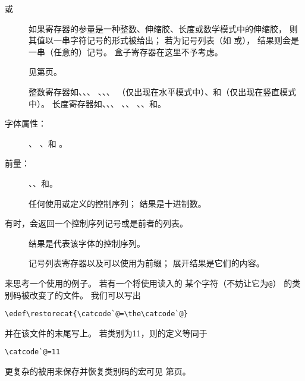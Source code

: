 \documentclass{book}
\begin{document}
\begin{description}\item [或]
如果寄存器的参量是一种整数、伸缩胶、长度或数学模式中的伸缩胶，
则其值以一串字符记号的形式被给出；
若为记号列表（如
或），
结果则会是一串（任意的）记号。
盒子寄存器在这里不予考虑。
\item []
见第\pageref{codename}页。
\item []
整数寄存器如、、、
、、、
（仅出现在水平模式中）、和（仅出现在竖直模式中）。
长度寄存器如、、、
、、
、、和。
\item [字体属性：]
、
、和
。
\item [前量：]
、、和。
\item []
任何使用或定义的控制序列；
结果是十进制数。
\end{description}
有时，会返回一个控制序列记号或是前者的列表。
\begin{description}\item []
结果是代表该字体的控制序列。
\item []
记号列表寄存器以及可以使用为前缀；
展开结果是它们的内容。
\end{description}

来思考一个使用的例子。
若有一个将使用读入的
某个字符（不妨让它为\verb-@-）
的类别码被改变了的文件。
我们可以写出
\begin{verbatim}
\edef\restorecat{\catcode`@=\the\catcode`@}
\end{verbatim}
并在该文件的末尾写上。
若类别为11，则的定义等同于
\begin{verbatim}
\catcode`@=11
\end{verbatim}
更复杂的被用来保存并恢复类别码的宏可见
第\pageref{store:cat}页。
\end{document}
